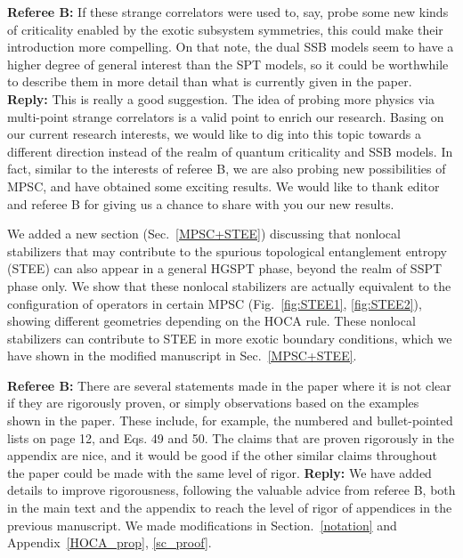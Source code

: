 \documentclass{article}
\begin{document}
\begin{tcolorbox}[title=Reply 6B (point-to-point reply),breakable]
\textbf{Referee B:}  If these
strange correlators were used to, say, probe some new kinds of
criticality enabled by the exotic subsystem symmetries, this could
make their introduction more compelling. On that note, the dual SSB
models seem to have a higher degree of general interest than the SPT
models, so it could be worthwhile to describe them in more detail than
what is currently given in the paper.  
\tcblower
\textbf{Reply:} This is really a good suggestion. The idea of probing more physics via multi-point strange correlators is a valid point to enrich our research. Basing on our current research interests, we would like to dig into this topic towards a different direction instead of the realm of quantum criticality and SSB models. In fact, similar to the interests of referee B, we are also probing new possibilities of MPSC, and have obtained some exciting results. We would like to thank editor and referee B for giving us a chance to share with you our new results. 

We added a new section (Sec.~\ref{MPSC+STEE}) discussing that nonlocal stabilizers that may contribute to the spurious topological entanglement entropy (STEE) can also appear in a general HGSPT phase, beyond the realm of SSPT phase only. We show that these nonlocal stabilizers are actually equivalent to the configuration of operators in certain MPSC (Fig.~\ref{fig:STEE1}, \ref{fig:STEE2}), showing different geometries depending on the HOCA rule. These nonlocal stabilizers can contribute to STEE in more exotic boundary conditions, which we have shown in the modified manuscript in Sec.~\ref{MPSC+STEE}.
\end{tcolorbox}

\begin{tcolorbox}[title=Reply 7 (point-to-point reply)]
\textbf{Referee B:}  There are several statements made in the paper where it is not clear
if they are rigorously proven, or simply observations based on the
examples shown in the paper. These include, for example, the numbered
and bullet-pointed lists on page 12, and Eqs. 49 and 50. The claims
that are proven rigorously in the appendix are nice, and it would be
good if the other similar claims throughout the paper could be made
with the same level of rigor.
\tcblower
\textbf{Reply:} We have added details to improve rigorousness, following the valuable advice from referee B, both in the main text and the appendix to reach the level of rigor of appendices in the previous manuscript. We made modifications in Section.~\ref{notation} and Appendix~\ref{HOCA_prop}, \ref{sc_proof}.
\end{tcolorbox}
\end{document}
